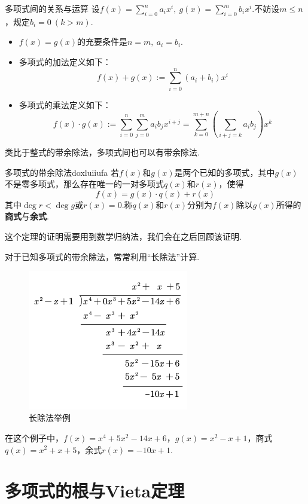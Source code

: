 \documentclass[lang=cn, zihao=5]{elegantbook}
\newcommand{\ssb}[1]{\left( #1 \right)}
\begin{document}
\begin{definition}{多项式间的关系与运算}
	设$f(x) = \sum_{i=0}^{n}a_i x^i,~g(x) = \sum_{i=0}^{m}b_i x^i$.不妨设$m \leq n$，规定$b_i=0~(k > m)$.
	\begin{itemize}
		\item $f(x)=g(x)$的充要条件是$n=m,~a_i=b_i$.
		\item 多项式的加法定义如下：$$f(x) + g(x) := \sum_{i=0}^{n} (a_i + b_i)x^{i}$$
		\item 多项式的乘法定义如下：$$f(x) \cdot g(x) := \sum_{i=0}^{n} \sum_{j=0}^{m} a_ib_j x^{i+j} = \sum_{k=0}^{m+n} \ssb{\sum_{i+j=k}a_ib_j}x^k$$
	\end{itemize}
\end{definition}

类比于整式的带余除法，多项式间也可以有带余除法.

\begin{theorem}{多项式的带余除法}{doxluiiufa}
	若$f(x)$和$g(x)$是两个已知的多项式，其中$g(x)$不是零多项式，那么存在唯一的一对多项式$q(x)$和$r(x)$，使得$$f(x) = g(x) \cdot q(x) + r(x)$$其中$\deg r < \deg g$或$r(x)=0$.称$q(x)$和$r(x)$分别为$f(x)$除以$g(x)$所得的\textbf{商式}与\textbf{余式}.
\end{theorem}
\begin{remark}
	这个定理的证明需要用到数学归纳法，我们会在之后回顾该证明.
\end{remark}

对于已知多项式的带余除法，常常利用“长除法”计算.

\begin{figure}[H]
	\centering
	\includegraphics[width=7cm]{attachment/202304151doxlui.pdf}
	\caption{长除法举例}
\end{figure}

在这个例子中，$f(x)=x^4+5x^2-14x+6$，$g(x)=x^2-x+1$，商式$q(x)=x^2+x+5$，余式$r(x)=-10x+1$.

\section{多项式的根与Vieta定理}
\end{document}
